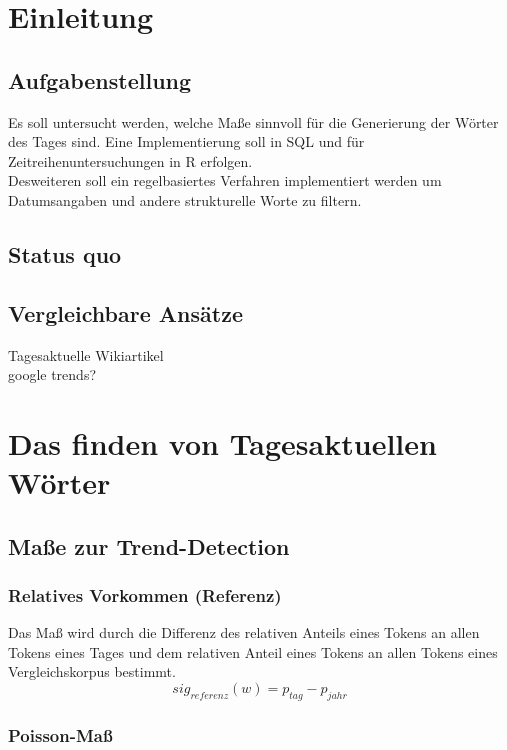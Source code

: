 


\ourtitlepage 
\tableofcontents
{} %
\clearpage
{} %
\chapter{Einleitung}
\section{Aufgabenstellung}
Es soll untersucht werden, welche Maße sinnvoll für die Generierung der Wörter des Tages sind. Eine Implementierung soll in SQL und für Zeitreihenuntersuchungen in R erfolgen.\\
Desweiteren soll ein regelbasiertes Verfahren implementiert werden um Datumsangaben und andere strukturelle Worte zu filtern.\\
\section{Status quo}
\section{Vergleichbare Ansätze}
Tagesaktuelle Wikiartikel\\
google trends?\\


\chapter{Das finden von Tagesaktuellen Wörter}
\section{Maße zur Trend-Detection}
\subsection{Relatives Vorkommen (Referenz)}
Das Maß wird durch die Differenz des relativen Anteils eines Tokens an allen Tokens eines Tages und dem relativen Anteil eines Tokens an allen Tokens eines Vergleichskorpus bestimmt. 
\begin{equation}
sig_{referenz}(w) = p_{tag} - p_{jahr}
\end{equation}

\subsection{Poisson-Maß}

